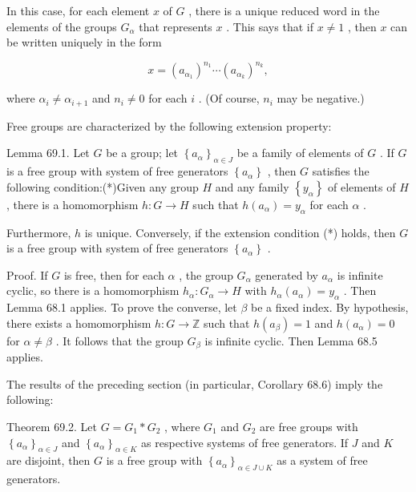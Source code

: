 In this case, for each element \(x\) of \(G\) , there is a unique reduced word in the elements of the groups \({G}_{\alpha }\) that represents \(x\) . This says that if \(x \neq  1\) , then \(x\) can be written uniquely in the form

\[
x = {\left( {a}_{{\alpha }_{1}}\right) }^{{n}_{1}}\cdots {\left( {a}_{{\alpha }_{k}}\right) }^{{n}_{k}},
\]

where \({\alpha }_{i} \neq  {\alpha }_{i + 1}\) and \({n}_{i} \neq  0\) for each \(i\) . (Of course, \({n}_{i}\) may be negative.)

Free groups are characterized by the following extension property:

Lemma 69.1. Let \(G\) be a group; let \({\left\{  {a}_{\alpha }\right\}  }_{\alpha  \in  J}\) be a family of elements of \(G\) . If \(G\) is a free group with system of free generators \(\left\{  {a}_{\alpha }\right\}\) , then \(G\) satisfies the following condition:(*)Given any group \(H\) and any family \(\left\{  {y}_{\alpha }\right\}\) of elements of \(H\) , there is a homomorphism \(h : G \rightarrow  H\) such that \(h\left( {a}_{\alpha }\right)  = {y}_{\alpha }\) for each \(\alpha\) .

Furthermore, \(h\) is unique. Conversely, if the extension condition (*) holds, then \(G\) is a free group with system of free generators \(\left\{  {a}_{\alpha }\right\}\) .

Proof. If \(G\) is free, then for each \(\alpha\) , the group \({G}_{\alpha }\) generated by \({a}_{\alpha }\) is infinite cyclic, so there is a homomorphism \({h}_{\alpha } : {G}_{\alpha } \rightarrow  H\) with \({h}_{\alpha }\left( {a}_{\alpha }\right)  = {y}_{\alpha }\) . Then Lemma 68.1 applies. To prove the converse, let \(\beta\) be a fixed index. By hypothesis, there exists a homomorphism \(h : G \rightarrow  \mathbb{Z}\) such that \(h\left( {a}_{\beta }\right)  = 1\) and \(h\left( {a}_{\alpha }\right)  = 0\) for \(\alpha  \neq  \beta\) . It follows that the group \({G}_{\beta }\) is infinite cyclic. Then Lemma 68.5 applies.

The results of the preceding section (in particular, Corollary 68.6) imply the following:

Theorem 69.2. Let \(G = {G}_{1} * {G}_{2}\) , where \({G}_{1}\) and \({G}_{2}\) are free groups with \({\left\{  {a}_{\alpha }\right\}  }_{\alpha  \in  J}\) and \({\left\{  {a}_{\alpha }\right\}  }_{\alpha  \in  K}\) as respective systems of free generators. If \(J\) and \(K\) are disjoint, then \(G\) is a free group with \({\left\{  {a}_{\alpha }\right\}  }_{\alpha  \in  J \cup  K}\) as a system of free generators.

